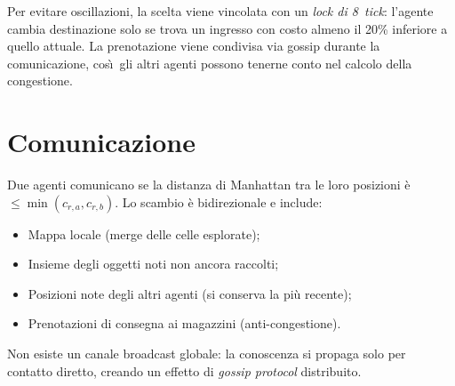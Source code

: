 Per evitare oscillazioni, la scelta viene vincolata con un \emph{lock di 8~tick}:
l'agente cambia destinazione solo se trova un ingresso con costo
almeno il 20\% inferiore a quello attuale.
La prenotazione viene condivisa via gossip durante la comunicazione, cos\`\i\
gli altri agenti possono tenerne conto nel calcolo della congestione.

\section{Comunicazione}

Due agenti comunicano se la distanza di Manhattan tra le loro posizioni \`e $\leq \min(c_{r,a}, c_{r,b})$.
Lo scambio \`e bidirezionale e include:

\begin{itemize}
  \item Mappa locale (merge delle celle esplorate);
  \item Insieme degli oggetti noti non ancora raccolti;
  \item Posizioni note degli altri agenti (si conserva la pi\`u recente);
  \item Prenotazioni di consegna ai magazzini (anti-congestione).
\end{itemize}

Non esiste un canale broadcast globale: la conoscenza si propaga solo per contatto diretto,
creando un effetto di \textit{gossip protocol} distribuito.
